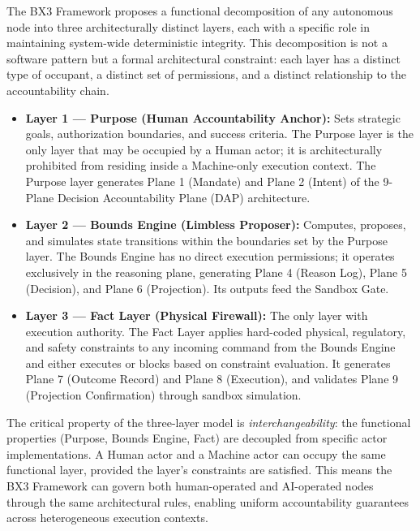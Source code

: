 \documentclass[12pt]{article}
\begin{document}
The BX3 Framework \cite{bx3framework2026} proposes a functional decomposition of any autonomous node into three architecturally distinct layers, each with a specific role in maintaining system-wide deterministic integrity. This decomposition is not a software pattern but a formal architectural constraint: each layer has a distinct type of occupant, a distinct set of permissions, and a distinct relationship to the accountability chain.

\begin{itemize}
    \item \textbf{Layer 1 — Purpose (Human Accountability Anchor):} Sets strategic goals, authorization boundaries, and success criteria. The Purpose layer is the only layer that may be occupied by a Human actor; it is architecturally prohibited from residing inside a Machine-only execution context. The Purpose layer generates Plane 1 (Mandate) and Plane 2 (Intent) of the 9-Plane Decision Accountability Plane (DAP) architecture.
    \item \textbf{Layer 2 — Bounds Engine (Limbless Proposer):} Computes, proposes, and simulates state transitions within the boundaries set by the Purpose layer. The Bounds Engine has no direct execution permissions; it operates exclusively in the reasoning plane, generating Plane 4 (Reason Log), Plane 5 (Decision), and Plane 6 (Projection). Its outputs feed the Sandbox Gate.
    \item \textbf{Layer 3 — Fact Layer (Physical Firewall):} The only layer with execution authority. The Fact Layer applies hard-coded physical, regulatory, and safety constraints to any incoming command from the Bounds Engine and either executes or blocks based on constraint evaluation. It generates Plane 7 (Outcome Record) and Plane 8 (Execution), and validates Plane 9 (Projection Confirmation) through sandbox simulation.
\end{itemize}

The critical property of the three-layer model is \textit{interchangeability}: the functional properties (Purpose, Bounds Engine, Fact) are decoupled from specific actor implementations. A Human actor and a Machine actor can occupy the same functional layer, provided the layer's constraints are satisfied. This means the BX3 Framework can govern both human-operated and AI-operated nodes through the same architectural rules, enabling uniform accountability guarantees across heterogeneous execution contexts.
\end{document}

